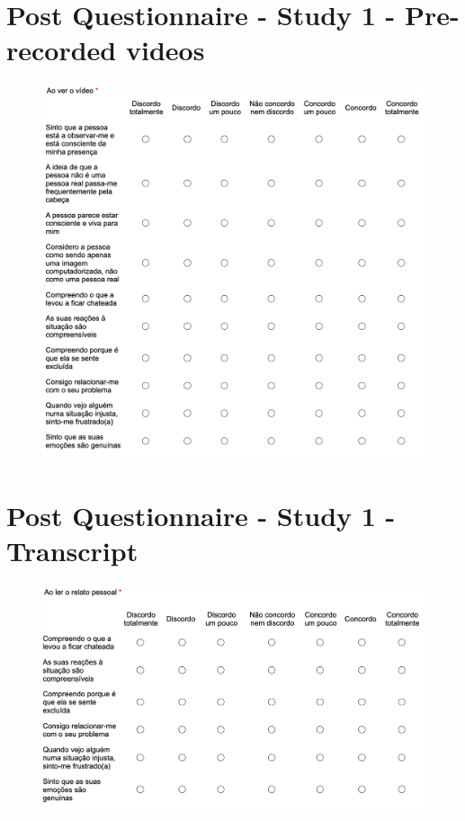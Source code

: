 \section{Post Questionnaire - Study 1 - Pre-recorded videos}
\label{appendix:videoPost}
\begin{figure}[h!]
\centering
\includegraphics[scale=0.65]{figures/post.png}
\end{figure}

\clearpage
\section{Post Questionnaire - Study 1 - Transcript}
\label{appendix:transcriptPost}
\begin{figure}[h!]
\centering
\includegraphics[scale=0.6]{figures/postTranscript.png}
\end{figure}

